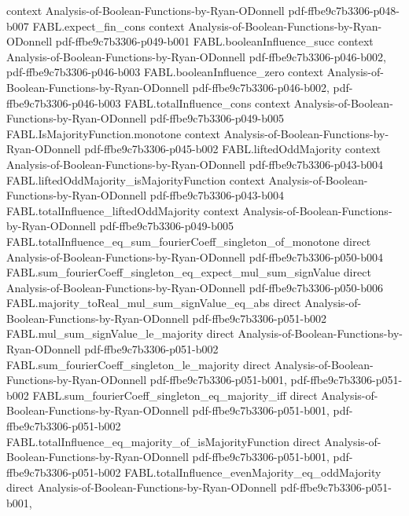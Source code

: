 \begin{theorem}
  {context}
  {Analysis-of-Boolean-Functions-by-Ryan-ODonnell}
  {pdf-ffbe9c7b3306-p048-b007}
\proofstep
  {FABL.expect_fin_cons}
  {context}
  {Analysis-of-Boolean-Functions-by-Ryan-ODonnell}
  {pdf-ffbe9c7b3306-p049-b001}
\proofstep
  {FABL.booleanInfluence_succ}
  {context}
  {Analysis-of-Boolean-Functions-by-Ryan-ODonnell}
  {pdf-ffbe9c7b3306-p046-b002,
    pdf-ffbe9c7b3306-p046-b003}
\proofstep
  {FABL.booleanInfluence_zero}
  {context}
  {Analysis-of-Boolean-Functions-by-Ryan-ODonnell}
  {pdf-ffbe9c7b3306-p046-b002,
    pdf-ffbe9c7b3306-p046-b003}
\proofstep
  {FABL.totalInfluence_cons}
  {context}
  {Analysis-of-Boolean-Functions-by-Ryan-ODonnell}
  {pdf-ffbe9c7b3306-p049-b005}
\proofstep
  {FABL.IsMajorityFunction.monotone}
  {context}
  {Analysis-of-Boolean-Functions-by-Ryan-ODonnell}
  {pdf-ffbe9c7b3306-p045-b002}
\proofstep
  {FABL.liftedOddMajority}
  {context}
  {Analysis-of-Boolean-Functions-by-Ryan-ODonnell}
  {pdf-ffbe9c7b3306-p043-b004}
\proofstep
  {FABL.liftedOddMajority_isMajorityFunction}
  {context}
  {Analysis-of-Boolean-Functions-by-Ryan-ODonnell}
  {pdf-ffbe9c7b3306-p043-b004}
\proofstep
  {FABL.totalInfluence_liftedOddMajority}
  {context}
  {Analysis-of-Boolean-Functions-by-Ryan-ODonnell}
  {pdf-ffbe9c7b3306-p049-b005}
\proofstep
  {FABL.totalInfluence_eq_sum_fourierCoeff_singleton_of_monotone}
  {direct}
  {Analysis-of-Boolean-Functions-by-Ryan-ODonnell}
  {pdf-ffbe9c7b3306-p050-b004}
\proofstep
  {FABL.sum_fourierCoeff_singleton_eq_expect_mul_sum_signValue}
  {direct}
  {Analysis-of-Boolean-Functions-by-Ryan-ODonnell}
  {pdf-ffbe9c7b3306-p050-b006}
\proofstep
  {FABL.majority_toReal_mul_sum_signValue_eq_abs}
  {direct}
  {Analysis-of-Boolean-Functions-by-Ryan-ODonnell}
  {pdf-ffbe9c7b3306-p051-b002}
\proofstep
  {FABL.mul_sum_signValue_le_majority}
  {direct}
  {Analysis-of-Boolean-Functions-by-Ryan-ODonnell}
  {pdf-ffbe9c7b3306-p051-b002}
\proofstep
  {FABL.sum_fourierCoeff_singleton_le_majority}
  {direct}
  {Analysis-of-Boolean-Functions-by-Ryan-ODonnell}
  {pdf-ffbe9c7b3306-p051-b001,
    pdf-ffbe9c7b3306-p051-b002}
\proofstep
  {FABL.sum_fourierCoeff_singleton_eq_majority_iff}
  {direct}
  {Analysis-of-Boolean-Functions-by-Ryan-ODonnell}
  {pdf-ffbe9c7b3306-p051-b001,
    pdf-ffbe9c7b3306-p051-b002}
\proofstep
  {FABL.totalInfluence_eq_majority_of_isMajorityFunction}
  {direct}
  {Analysis-of-Boolean-Functions-by-Ryan-ODonnell}
  {pdf-ffbe9c7b3306-p051-b001,
    pdf-ffbe9c7b3306-p051-b002}
\proofstep
  {FABL.totalInfluence_evenMajority_eq_oddMajority}
  {direct}
  {Analysis-of-Boolean-Functions-by-Ryan-ODonnell}
  {pdf-ffbe9c7b3306-p051-b001,
}
\end{theorem}
